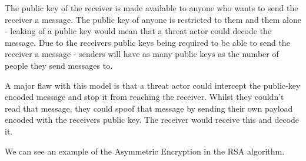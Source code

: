 The public key of the receiver is made available to anyone who wants to send the receiver a message. The public key of anyone is restricted to them and them alone - leaking of a public key would mean that a threat actor could decode the message. Due to the receivers public keys being required to be able to send the receiver a message - senders will have as many public keys as the number of people they send messages to.

A major flaw with this model is that a threat actor could intercept the public-key encoded message and stop it from reaching the receiver. Whilst they couldn't read that message, they could spoof that message by sending their own payload encoded with the receivers public key. The receiver would receive this and decode it. 

We can see an example of the Asymmetric Encryption in the RSA algorithm. 